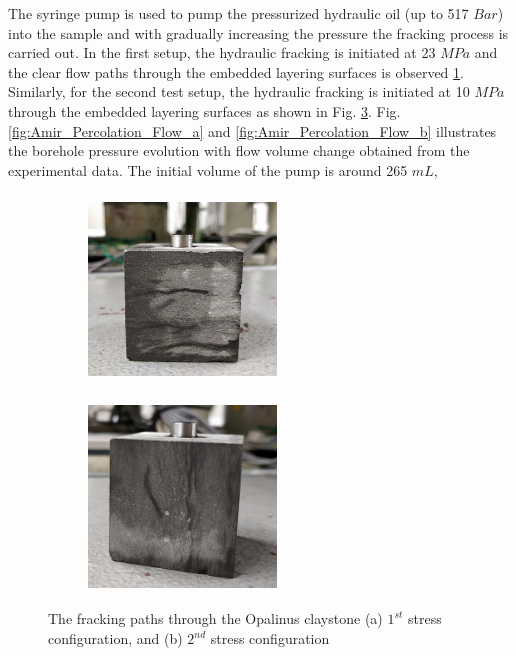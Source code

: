 The syringe pump is used to pump the pressurized hydraulic oil (up to 517 $Bar$) into the sample and with gradually increasing the pressure the fracking process is carried out. In the first setup, the hydraulic fracking is initiated at 23 $MPa$ and the clear flow paths through the embedded layering surfaces is observed \ref{fig:Amir_Percolation_Frack_a}. Similarly, for the second test setup, the hydraulic fracking is initiated at 10 $MPa$ through the embedded layering surfaces as shown in Fig. \ref{fig:Amir_Percolation_Frack_b}. Fig. \ref{fig:Amir_Percolation_Flow_a} and \ref{fig:Amir_Percolation_Flow_b} illustrates the borehole pressure evolution with flow volume change obtained from the experimental data. The initial volume of the pump is around 265 $mL$,

\begin{figure}[!ht]
\begin{subfigure}[c]{0.48\textwidth}
\centering
\includegraphics[width=5cm,height=5cm]{figures/Amir_Percolation_Frack_a.png}
\subcaption{}
\label{fig:Amir_Percolation_Frack_a}
\end{subfigure}
\hfill
\begin{subfigure}[c]{0.48\textwidth}
\centering
\includegraphics[width=5cm,height=5cm]{figures/Amir_Percolation_Frack_b.png}
\subcaption{}
\label{fig:Amir_Percolation_Frack_b}
\end{subfigure}
\caption{The fracking paths through the Opalinus claystone (a) $1^{st}$ stress configuration, and (b) $2^{nd}$ stress configuration}
\end{figure}


